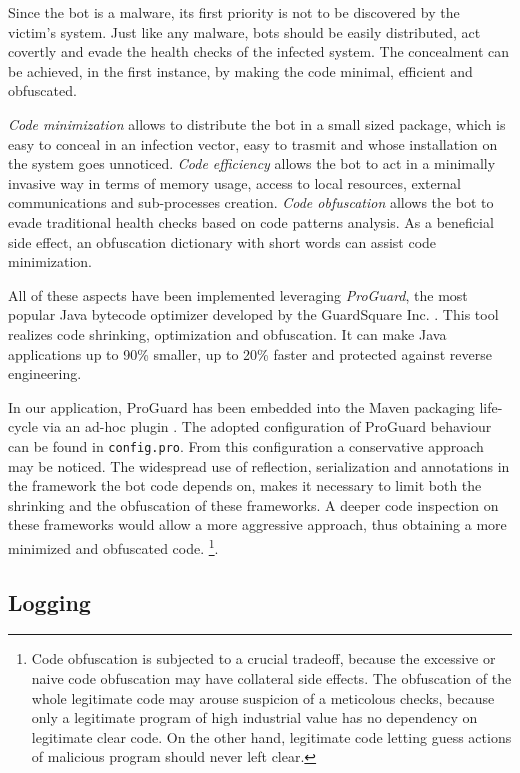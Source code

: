 Since the bot is a malware, its first priority is not to be discovered by the victim's system. Just like any malware, bots should be easily distributed, act covertly and evade the health checks of the infected system. The concealment can be achieved, in the first instance, by making the code minimal, efficient and obfuscated.

\textit{Code minimization} allows to distribute the bot in a small sized package, which is easy to conceal in an infection vector, easy to trasmit and whose installation on the system goes unnoticed.
\textit{Code efficiency} allows the bot to act in a minimally invasive way in terms of memory usage, access to local resources, external communications and sub-processes creation.
\textit{Code obfuscation} allows the bot to evade traditional health checks based on code patterns analysis. As a beneficial side effect, an obfuscation dictionary with short words can assist code minimization.

All of these aspects have been implemented leveraging \textit{ProGuard}, the most popular Java bytecode optimizer developed by the GuardSquare Inc. \cite{proguard}. This tool realizes code shrinking, optimization and obfuscation. It can make Java applications up to 90\% smaller, up to 20\% faster and protected against reverse engineering\cite{guardsquare}.

In our application, ProGuard has been embedded into the Maven packaging life-cycle via an ad-hoc plugin \cite{proguard-maven-plugin}. The adopted configuration of ProGuard behaviour can be found in \texttt{config.pro}. From this configuration a conservative approach may be noticed. The widespread use of reflection, serialization and annotations in the framework the bot code depends on, makes it necessary to limit both the shrinking and the obfuscation of these frameworks. A deeper code inspection on these frameworks would allow a more aggressive approach, thus obtaining a more minimized and obfuscated code. \footnote{Code obfuscation is subjected to a crucial tradeoff, because the excessive or naive code obfuscation may have collateral side effects. The obfuscation of the whole legitimate code may arouse suspicion of a meticolous checks, because only a legitimate program of high industrial value has no dependency on legitimate clear code. On the other hand, legitimate code letting guess actions of malicious program should never left clear.}.


\subsection{Logging}
\label{sec:logging}


